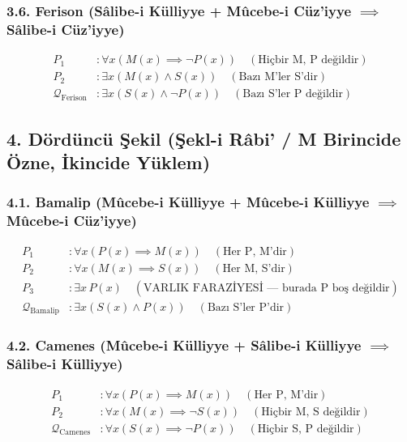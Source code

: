\documentclass[11pt, a4paper]{article}
\begin{document}
\subsubsection{3.6. Ferison (Sâlibe-i Külliyye + Mûcebe-i Cüz'iyye $\implies$ Sâlibe-i Cüz'iyye)}
\begin{align}
P_1 &: \forall x (M(x) \implies \neg P(x)) \quad (\text{Hiçbir M, P değildir}) \\
P_2 &: \exists x (M(x) \land S(x)) \quad (\text{Bazı M'ler S'dir}) \\
\mathcal{Q}_{\text{Ferison}} &: \exists x (S(x) \land \neg P(x)) \quad (\text{Bazı S'ler P değildir})
\end{align}

\subsection{4. Dördüncü Şekil (Şekl-i Râbi' / M Birincide Özne, İkincide Yüklem)}

\subsubsection{4.1. Bamalip (Mûcebe-i Külliyye + Mûcebe-i Külliyye $\implies$ Mûcebe-i Cüz'iyye)}
\begin{align}
P_1 &: \forall x (P(x) \implies M(x)) \quad (\text{Her P, M'dir}) \\
P_2 &: \forall x (M(x) \implies S(x)) \quad (\text{Her M, S'dir}) \\
P_3 &: \exists x \, P(x) \quad (\text{VARLIK FARAZİYESİ --- burada P boş değildir}) \\
\mathcal{Q}_{\text{Bamalip}} &: \exists x (S(x) \land P(x)) \quad (\text{Bazı S'ler P'dir})
\end{align}

\subsubsection{4.2. Camenes (Mûcebe-i Külliyye + Sâlibe-i Külliyye $\implies$ Sâlibe-i Külliyye)}
\begin{align}
P_1 &: \forall x (P(x) \implies M(x)) \quad (\text{Her P, M'dir}) \\
P_2 &: \forall x (M(x) \implies \neg S(x)) \quad (\text{Hiçbir M, S değildir}) \\
\mathcal{Q}_{\text{Camenes}} &: \forall x (S(x) \implies \neg P(x)) \quad (\text{Hiçbir S, P değildir})
\end{align}
\end{document}
